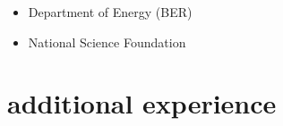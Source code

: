 \documentclass[10pt,oneside]{article}
\begin{document}
\mbox{}\vspace{-\dimexpr\baselineskip\relax}

\begin{itemize}[label={}]
  
  \item Department of Energy (BER)
        
  \item National Science Foundation
        
\end{itemize}


\section{additional experience}

\mbox{}\vspace{-\dimexpr\baselineskip\relax}
\end{document}

